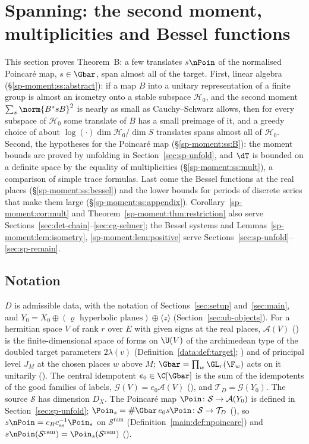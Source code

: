 \section{Spanning: the second moment, multiplicities and Bessel functions}\label{sec:sp-moment}

This section proves Theorem~B: a few translates $s\nPoin$ of the normalised Poincaré map,
$s\in\Gbar$, span almost all of the target. First, linear algebra (\S\ref{sp-moment:ss:abstract}):
if a map $B$ into a unitary representation of a finite group is almost an isometry onto a stable
subspace $\mathcal H_0$, and the second moment $\sum_s\norm{B^*sB}^2$ is nearly as small as Cauchy--Schwarz
allows, then for every subspace of $\mathcal H_0$ some translate of $B$ has a small preimage of it, and a
greedy choice of about $\log(\cdot)\dim\mathcal H_0/\dim S$ translates spans almost all of $\mathcal H_0$. Second,
the hypotheses for the Poincaré map (\S\ref{sp-moment:ss:B}): the moment bounds are proved by
unfolding in Section~\ref{sec:sp-unfold}, and $\dT$ is bounded on a definite space by the
equality of multiplicities (\S\ref{sp-moment:ss:mult}), a comparison of simple trace formulas.
Last come the Bessel functions at the real places (\S\ref{sp-moment:ss:bessel}) and the lower
bounds for periods of discrete series that make them large (\S\ref{sp-moment:ss:appendix}).
Corollary~\ref{sp-moment:cor:mult} and Theorem~\ref{sp-moment:thm:restriction} also serve
Sections~\ref{sec:det-chain}--\ref{sec:cg-selmer}; the Bessel systems and
Lemmas~\ref{sp-moment:lem:isometry}, \ref{sp-moment:lem:positive} serve
Sections~\ref{sec:sp-unfold}--\ref{sec:sp-remain}.

\subsection{Notation}\label{sp-moment:ss:notation}
$D$ is admissible data, with the notation of Sections~\ref{sec:setup} and~\ref{sec:main}, and
$Y_0=X_0\oplus(\varrho\text{ hyperbolic planes})\oplus\langle z\rangle$ (Section~\ref{sec:ub-objects}).
For a hermitian space $V$ of rank $r$ over
$E$ with given signs at the real places, $\mathcal A(V)$ () is the
finite-dimensional space of forms on $\U(V)$ of the archimedean type of the doubled target parameters
$2\lambda(v)$ (Definition~\ref{data:def:target}; ) and of principal level $J_M$ at the chosen places $w$ above $M$;
$\Gbar=\prod_w\GL_r(\F_w)$ acts on it unitarily (). The central
idempotent $e_0\in\C[\Gbar]$ is the sum of the idempotents of the good families of labels,
$\mathcal G(V)=e_0\mathcal A(V)$ (), and $\mathcal T_D=\mathcal G(Y_0)$. The
source $\mathcal S$ has dimension $D_X$. The Poincaré map $\Poin\colon\mathcal S\to\mathcal A(Y_0)$
is defined in Section~\ref{sec:sp-unfold}; $\Poin_s=\#\Gbar\,e_0s\Poin\colon\mathcal S\to\mathcal T_D$
(), so $s\nPoin=c_Bc_{\mathrm{ss}}^{-1}\Poin_s$ on $\mathcal S^{\mathrm{ram}}$
(Definition~\ref{main:def:npoincare}) and $s\nPoin(\mathcal S^{\mathrm{ram}})=
\Poin_s(\mathcal S^{\mathrm{ram}})$ ().

